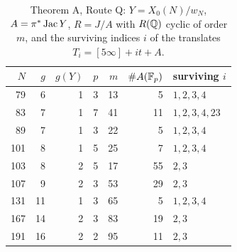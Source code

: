 \begin{table}[ht]\centering\small
\caption{Theorem A, Route Q: $Y=X_0(N)/w_N$, $A=\pi^*\operatorname{Jac} Y$, $R=J/A$ with $R(\mathbb{Q})$ cyclic of order $m$, and the
surviving indices $i$ of the translates $T_i=[5\infty]+it+A$.}\label{tab:routeQ}
\begin{tabular}{rrrrrrl}\toprule
$N$&$g$&$g(Y)$&$p$&$m$&$\#A(\mathbb{F}_p)$&surviving $i$\\\midrule
79&6&1&3&13&5&$1,2,3,4$\\
83&7&1&7&41&11&$1,2,3,4,23$\\
89&7&1&3&22&5&$1,2,3,4$\\
101&8&1&5&25&7&$1,2,3,4$\\
103&8&2&5&17&55&$2,3$\\
107&9&2&3&53&29&$2,3$\\
131&11&1&3&65&5&$1,2,3,4$\\
167&14&2&3&83&19&$2,3$\\
191&16&2&2&95&11&$2,3$\\\bottomrule
\end{tabular}
\end{table}

